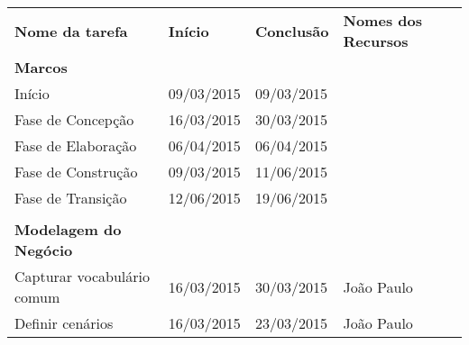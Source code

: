 \begin{table}[h]
\begin{tabular}{llll}
\textbf{Nome da tarefa}                & \textbf{Início} & \textbf{Conclusão} & \textbf{Nomes dos Recursos}                                                                             \\
\textbf{Marcos}                        &                 &                    &                                                                                                         \\
Início                                 & 09/03/2015      & 09/03/2015         &                                                                                                         \\
Fase de Concepção                      & 16/03/2015      & 30/03/2015         &                                                                                                         \\
Fase de Elaboração                     & 06/04/2015      & 06/04/2015         &                                                                                                         \\
Fase de Construção                     & 09/03/2015      & 11/06/2015         &                                                                                                         \\
Fase de Transição                      & 12/06/2015      & 19/06/2015         &                                                                                                         \\
                                       &                 &                    &                                                                                                         \\
\textbf{Modelagem do Negócio}          &                 &                    &                                                                                                         \\
Capturar vocabulário comum             & 16/03/2015      & 30/03/2015         & João Paulo                                                                                              \\
Definir cenários                       & 16/03/2015      & 23/03/2015         & João Paulo                                                                                              \\

\end{tabular}
\end{table}
